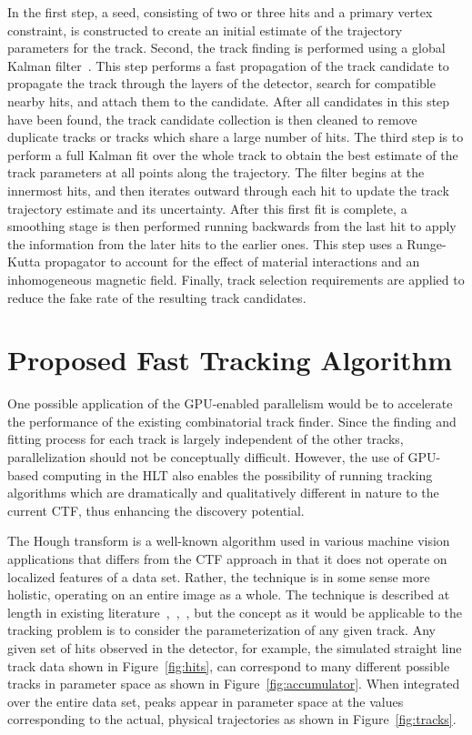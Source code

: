 \documentclass{JINST}
\begin{document}
In the first step, a seed, consisting of two or three hits and a primary vertex constraint,
is constructed to create an initial estimate of the trajectory parameters for the track. Second, the
track finding is performed using a global Kalman filter~\cite{Fruhwirth:1987fm}. This step performs a fast
propagation of the track candidate to propagate the track through the layers of the detector, search for
compatible nearby hits, and attach them to the candidate. After all candidates in this step have been
found, the track candidate collection is then cleaned to remove duplicate tracks or tracks which share a
large number of hits.  The third step is to perform a full Kalman fit over the whole track to obtain the
best estimate of the track parameters at all points along the trajectory. The filter begins at the
innermost hits, and then iterates outward through each hit to update the track trajectory estimate and
its uncertainty. After this first fit is complete, a smoothing stage is then performed running backwards
from the last hit to apply the information from the later hits to the earlier ones. This step uses a
Runge-Kutta propagator to account for the effect of material interactions and an inhomogeneous magnetic
field. Finally, track selection requirements are applied to reduce the fake rate of the resulting track
candidates.



\section{Proposed Fast Tracking Algorithm}

One possible application of the GPU-enabled parallelism would be to accelerate the performance of the
existing combinatorial track finder.  Since the finding and fitting process for each track is largely
independent of the other tracks, parallelization should not be conceptually difficult.  However, the use
of GPU-based computing in the HLT also enables the possibility of running tracking algorithms which are
dramatically and qualitatively different in nature to the current CTF, thus enhancing the discovery potential.

 The Hough transform is a well-known algorithm used in various machine
vision applications that differs from the CTF approach in that it does not operate on
localized features of a data set.  Rather, the technique is in some sense more
holistic, operating on an entire image as a whole. 
The technique is described at length in existing literature~\cite{bib:HT1},~\cite{bib:HT2},~\cite{bib:HT3},
but the concept as it would be applicable to the
tracking problem is to consider the parameterization of any given track.  Any given set of hits
observed in the detector, for example, the simulated straight line track data shown in Figure~\ref{fig:hits},
can correspond to many different possible tracks in parameter space as shown in Figure~\ref{fig:accumulator}.
When integrated over the entire data set, peaks appear in parameter space at the values corresponding to the actual, 
physical trajectories as shown in Figure~\ref{fig:tracks}.
\end{document}
